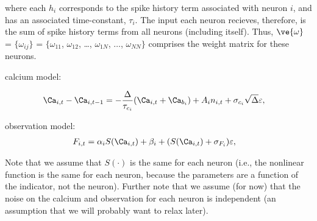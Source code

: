 \noindent where each $h_{i}$ corresponds to the spike history term associated with neuron $i$, and has an associated time-constant, $\tau_i$.  The input each neuron recieves, therefore, is the sum of spike history terms from all neurons (including itself).  Thus, $\ve{\omega}$ = $\{\omega_{ij}\}$ = $\{\omega_{11}$, $\omega_{12}$, \ldots, $\omega_{1N}$, $\ldots$, $\omega_{NN}\}$ comprises the weight matrix for these neurons.

calcium model:

\begin{align}
\Ca_{i,t} - \Ca_{i,t-1}&= -\frac{\Delta}{\tau_{c_i}} (\Ca_{i,t} + \Ca_{b_i}) + A_i n_{i,t} + \sigma_{c_i} \sqrt{\Delta} \varepsilon, 
\end{align}

observation model:
\begin{align} \label{eq:2obs}
F_{i,t} &= \alpha_i S(\Ca_{i,t}) + \beta_i + (S(\Ca_{i,t}) + \sigma_{F_i}) \varepsilon,
\end{align} 

Note that we assume that $S(\cdot)$ is the same for each neuron (i.e., the nonlinear function is the same for each neuron, because the parameters are a function of the indicator, not the neuron).  Further note that we assume (for now) that the noise on the calcium and observation for each neuron is independent (an assumption that we will probably want to relax later).
